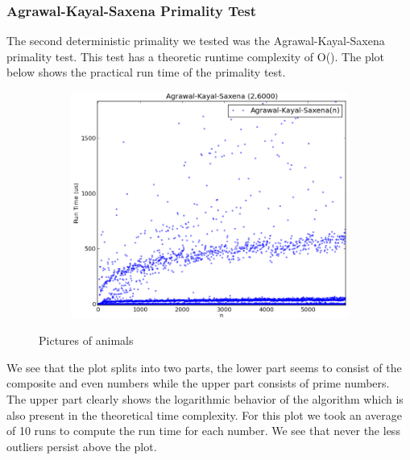 \documentclass[compressed,final,notitlepage,narroweqnarray,inline,twoside,]{ieee}
\begin{document}
\subsubsection{Agrawal-Kayal-Saxena Primality Test}
The second deterministic primality we tested was the Agrawal-Kayal-Saxena primality test. This test has a theoretic runtime complexity of O(). The plot below shows the practical run time of the primality test.
\begin{figure}[H]
        \centering
        \begin{subfigure}[b]{0.5\textwidth}
                \includegraphics[width=\textwidth]{../images/AKS}
                \label{fig:gull}
        \end{subfigure}
        \caption{Pictures of animals}\label{fig:animals}
\end{figure}
We see that the plot splits into two parts, the lower part seems to consist of the composite and even numbers while the upper part consists of prime numbers. The upper part clearly shows the logarithmic behavior of the algorithm which is also present in the theoretical time complexity. For this plot we took an average of 10 runs to compute the run time for each number. We see that never the less outliers persist above the plot. 
\end{document}
